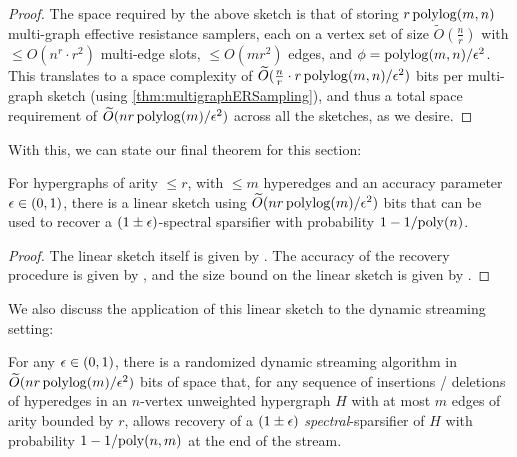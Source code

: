 \documentclass{article}
\begin{document}
\begin{proof}
    The space required by the above sketch is that of storing $r \operatorname{polylog}(m,n)$ multi-graph effective resistance samplers, each on a vertex set of size $\widetilde{O}(\frac{n}{r})$ with $\leq O(n^r \cdot r^2)$ multi-edge slots, $\leq O(m r^2)$ edges, and $\phi = \operatorname{polylog}(m,n) / \epsilon^2$. This translates to a space complexity of $\widetilde{O}(\frac{n}{r} \cdot r \operatorname{polylog}(m,n)/\epsilon^2)$ bits per multi-graph sketch (using \cref{thm:multigraphERSampling}), and thus a total space requirement of $\widetilde{O}(n r \operatorname{polylog}(m) / \epsilon^2)$ across all the sketches, as we desire.
\end{proof}


With this, we can state our final theorem for this section:

\begin{theorem}\label{thm:linearSketchmain}
    For hypergraphs of arity $\leq r$, with $\leq m$ hyperedges and an accuracy parameter $\epsilon \in (0,1)$, there is a linear sketch using $\widetilde{O}(n r \operatorname{polylog}(m) / \epsilon^2)$ bits that can be used to recover a $(1 \pm \epsilon)$-spectral sparsifier with probability $1 - 1 / \mathrm{poly}(n)$.
\end{theorem}

\begin{proof}
    The linear sketch itself is given by . The accuracy of the recovery procedure is given by , and the size bound on the linear sketch is given by .
\end{proof}

We also discuss the application of this linear sketch to the dynamic streaming setting:

\begin{corollary}\label{cor:dynamicStreaming}
    For any $\epsilon \in (0,1)$, there is a randomized dynamic streaming algorithm in $\widetilde{O}(nr \operatorname{polylog}(m) / \epsilon^2)$ bits of space that, for any sequence of insertions / deletions of hyperedges in an $n$-vertex unweighted hypergraph $H$ with at most $m$ edges of arity bounded by $r$, allows recovery of a $(1 \pm \epsilon)$ \emph{spectral}-sparsifier of $H$ with probability $1 - 1 / \mathrm{poly}(n,m)$ at the end of the stream.
\end{corollary}
\end{document}
